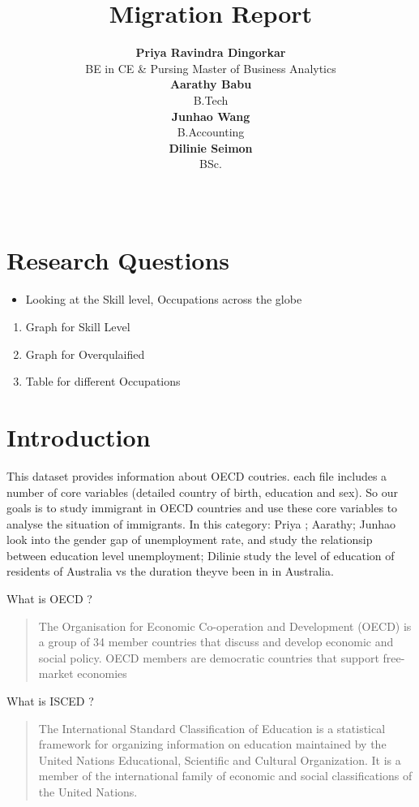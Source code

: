 \documentclass[11pt,a4paper,]{article}
\title{Migration Report}
\author{\sf\Large\textbf{ Priya Ravindra Dingorkar}\\ {\sf\large BE in CE \& Pursing Master of Business Analytics\\[0.5cm]} \sf\Large\textbf{ Aarathy Babu}\\ {\sf\large B.Tech\\[0.5cm]} \sf\Large\textbf{ Junhao Wang}\\ {\sf\large B.Accounting\\[0.5cm]} \sf\Large\textbf{ Dilinie Seimon}\\ {\sf\large BSc.\\[0.5cm]}}
\date{\sf\Date~\Month~\Year}
\makeatletter
\providecommand{\tightlist}{%
  \setlength{\itemsep}{0pt}\setlength{\parskip}{0pt}}
\def\titlepage{\front{\expandafter{\@title}}{\@author}{\@organization}}
\makeatother
\begin{document}
\titlepage

\section*{Research Questions}

\begin{itemize}
\tightlist
\item
  Looking at the Skill level, Occupations across the globe
\end{itemize}

\begin{enumerate}
   \item Graph for Skill Level
   \item Graph for Overqulaified 
   \item Table for different Occupations
 \end{enumerate}

\section*{Introduction}

This dataset provides information about OECD coutries. each file includes a number of core variables (detailed country of birth, education and sex). So our goals is to study immigrant in OECD countries and use these core variables to analyse the situation of immigrants. In this category: Priya ; Aarathy; Junhao look into the gender gap of unemployment rate, and study the relationsip between education level unemployment; Dilinie study the level of education of residents of Australia vs the duration theyve been in in Australia.

What is OECD ?

\begin{quote}
The Organisation for Economic Co-operation and Development (OECD) is a group of 34 member countries that discuss and develop economic and social policy. OECD members are democratic countries that support free-market economies
\end{quote}

What is ISCED ?

\begin{quote}
The International Standard Classification of Education is a statistical framework for organizing information on education maintained by the United Nations Educational, Scientific and Cultural Organization. It is a member of the international family of economic and social classifications of the United Nations.
\end{quote}
\end{document}

